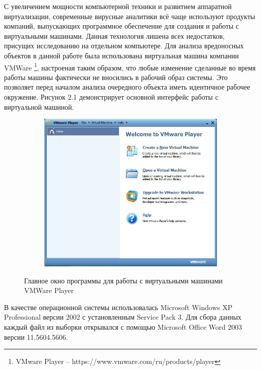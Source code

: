 С увеличением мощности компьютерной техники и развитием аппаратной виртуализации, современные вирусные аналитики всё чаще используют продукты компаний, выпускающих программное обеспечение для создания и работы с виртуальными машинами. 
Данная технология лишена всех недостатков, присущих исследованию на отдельном компьютере.
Для анализа вредоносных объектов в данной работе была использована виртуальная машина компании VMWare \footnote{VMware Player -- https://www.vmware.com/ru/products/player}, настроеная таким образом, что любые изменение сделанные во время работы машины фактически не вносились в рабочий образ системы.
Это позволяет перед началом анализа очередного объекта иметь идентичное рабочее окружение.
Рисунок 2.1 демонстрирует основной интерфейс работы с виртуальной машиной.

\newpage
\begin{figure}[ht]
	\centering
    \begin{subfigure}[b]{1\textwidth}
    \centering
        \includegraphics[scale=0.5]{vmware.jpg}        
    \end{subfigure}
 
    \caption{Главное окно программы для работы с виртуальными машинами VMWare Player}
    \label{fig_parsetree}
\end{figure}

В качестве операционной системы использовалась Microsoft Windows XP Professional версии 2002 с установленным Service Pack 3.
Для сбора данных каждый файл из выборки открывался с помощью Microsoft Office Word 2003 версии 11.5604.5606.


